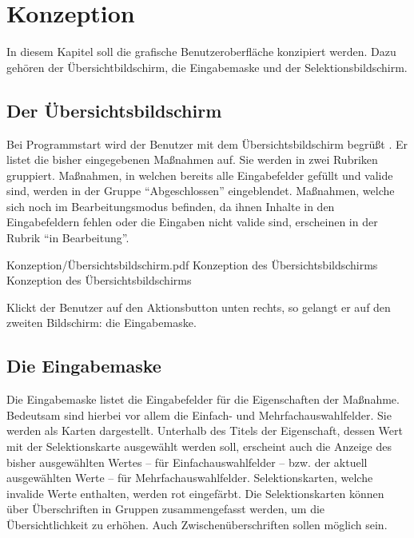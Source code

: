 \chapter{Konzeption}
\label{chap:Konzeption}

In diesem Kapitel soll die grafische Benutzeroberfläche konzipiert werden.
Dazu gehören der Übersichtbildschirm,
die Eingabemaske und der Selektionsbildschirm.

\section{Der Übersichtsbildschirm}

Bei Programmstart wird der Benutzer mit dem Übersichtsbildschirm begrüßt \Abb{\ref{fig:KonzeptionÜbersichtsbildschirm}} .
Er listet die bisher eingegebenen Maßnahmen auf. Sie werden in zwei Rubriken gruppiert.
Maßnahmen, in welchen bereits alle Eingabefelder gefüllt und valide sind, werden in der Gruppe \enquote{Abgeschlossen} eingeblendet.
Maßnahmen, welche sich noch im Bearbeitungsmodus befinden,
da ihnen Inhalte in den Eingabefeldern fehlen oder die Eingaben nicht valide sind,
erscheinen in der Rubrik \enquote{in Bearbeitung}. 



\begin{alexfigure}{Konzeption/Übersichtsbildschirm.pdf}
  {Konzeption des Übersichtsbildschirms}
  {Konzeption des Übersichtsbildschirms}

  \label{fig:KonzeptionÜbersichtsbildschirm}

\end{alexfigure}

Klickt der Benutzer auf den Aktionsbutton unten rechts, so gelangt er auf den zweiten Bildschirm: die Eingabemaske.

\section{Die Eingabemaske}

Die Eingabemaske \Abb{\ref{fig:KonzeptionEingabemaske}} listet die Eingabefelder für die  Eigenschaften der Maßnahme.
Bedeutsam sind hierbei vor allem die Einfach- und Mehrfachauswahlfelder.
Sie werden als Karten dargestellt.
Unterhalb des Titels der Eigenschaft,
dessen Wert mit der Selektionskarte ausgewählt werden soll,
erscheint auch die Anzeige des bisher ausgewählten Wertes
-- für Einfachauswahlfelder --
bzw. der aktuell ausgewählten Werte
-- für Mehrfachauswahlfelder.
Selektionskarten, welche invalide Werte enthalten, werden rot eingefärbt.
Die Selektionskarten können über Überschriften in Gruppen zusammengefasst werden,
um die Übersichtlichkeit zu erhöhen.
Auch Zwischenüberschriften sollen möglich sein.

